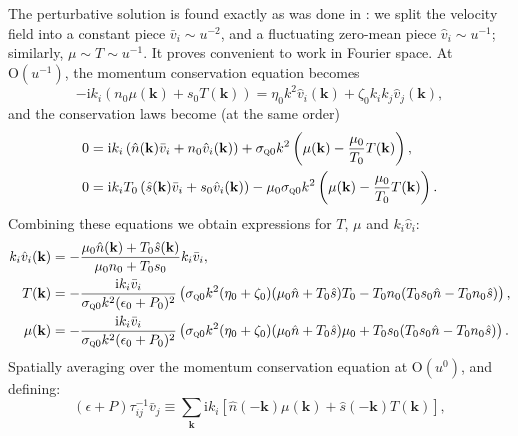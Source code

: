 \documentclass[10pt, oneside]{book}
\begin{document}
\begin{doublespace}
\begin{appendix}
The perturbative solution is found exactly as was done in \cite{Lucas:2015lna}:   we split the velocity field into a constant piece $\bar v_i \sim u^{-2}$, and a fluctuating zero-mean piece $\hat v_i \sim u^{-1}$;  similarly, $ \mu \sim  T \sim u^{-1}$.   It proves convenient to work in Fourier space.   At $\mathrm{O}(u^{-1})$, the momentum conservation equation becomes \begin{equation}
-\mathrm{i}k_i \left(n_0  \mu(\mathbf{k})+s_0 T(\mathbf{k})\right) = \eta_0 k^2  \hat v_i(\mathbf{k}) + \zeta_0 k_ik_j  \hat v_j(\mathbf{k}),
\end{equation} 
and the conservation laws become (at the same order) \begin{subequations}\begin{align}
0 &= \mathrm{i}k_i \left(\hat n(\mathbf{k})  \bar v_i + n_0  \hat v_i(\mathbf{k})\right)+ \sigma_{\textsc{q}0} k^2 \left( \mu(\mathbf{k}) - \frac{\mu_0}{T_0} T(\mathbf{k})\right), \\
0 &= \mathrm{i}k_i T_0 \left(\hat s(\mathbf{k})  \bar v_i + s_0  \hat v_i(\mathbf{k})\right) -\mu_0\sigma_{\textsc{q}0} k^2 \left( \mu(\mathbf{k}) - \frac{\mu_0}{T_0} T(\mathbf{k})\right).
\end{align}\end{subequations}
Combining these equations we obtain expressions for $ T$, $ \mu$ and $k_i  \hat v_i$: \begin{subequations}\begin{align}
k_i  \hat v_i(\mathbf{k}) &= -\frac{\mu_0 \hat n(\mathbf{k}) + T_0\hat s(\mathbf{k})}{\mu_0 n_0 + T_0s_0} k_i  \bar v_i, \\
 T(\mathbf{k}) &= -\frac{\mathrm{i}k_i  \bar v_i}{\sigma_{\textsc{q}0}k^2(\epsilon_0+P_0)^2}\left(\sigma_{\textsc{q}0}k^2 (\eta_0+\zeta_0)(\mu_0 \hat n + T_0\hat s)T_0 - T_0n_0(T_0s_0\hat n-T_0n_0\hat s)\right), \\
 \mu(\mathbf{k}) &= -\frac{\mathrm{i}k_i  \bar v_i}{\sigma_{\textsc{q}0}k^2(\epsilon_0+P_0)^2}\left(\sigma_{\textsc{q}0}k^2 (\eta_0+\zeta_0)(\mu_0 \hat n + T_0\hat s)\mu_0 + T_0s_0(T_0s_0\hat n-T_0n_0\hat s)\right).
\end{align}\end{subequations}
Spatially averaging over the momentum conservation equation at $\mathrm{O}(u^0)$, and defining: 
\begin{equation}
(\epsilon+P)\tau^{-1}_{ij}  \bar v_j \equiv  \sum_{\mathbf{k}} \mathrm{i}k_i \left[\hat n(-\mathbf{k})  \mu(\mathbf{k}) + \hat s(-\mathbf{k})  T(\mathbf{k})\right],
\end{equation}

\end{appendix}
\end{doublespace}
\end{document}
